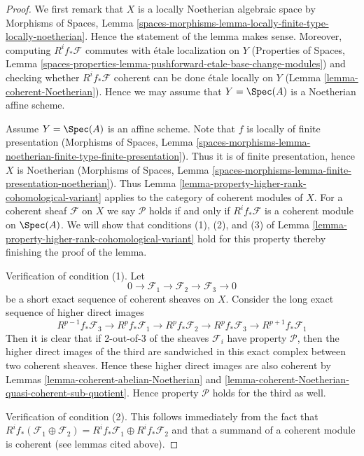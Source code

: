 \begin{proof}
We first remark that $X$ is a locally Noetherian algebraic space
by Morphisms of Spaces, Lemma
\ref{spaces-morphisms-lemma-locally-finite-type-locally-noetherian}.
Hence the statement of the lemma makes sense. Moreover, computing
$R^if_*\mathcal{F}$ commutes with \'etale localization on $Y$
(Properties of Spaces, Lemma
\ref{spaces-properties-lemma-pushforward-etale-base-change-modules})
and checking whether $R^if_*\mathcal{F}$ coherent can be done
\'etale locally on $Y$ (Lemma \ref{lemma-coherent-Noetherian}).
Hence we may assume that $Y = \Spec(A)$ is a Noetherian affine scheme.

\medskip\noindent
Assume $Y = \Spec(A)$ is an affine scheme. Note that $f$ is locally
of finite presentation
(Morphisms of Spaces, Lemma
\ref{spaces-morphisms-lemma-noetherian-finite-type-finite-presentation}).
Thus it is of finite presentation, hence $X$ is Noetherian
(Morphisms of Spaces, Lemma
\ref{spaces-morphisms-lemma-finite-presentation-noetherian}).
Thus Lemma \ref{lemma-property-higher-rank-cohomological-variant}
applies to the category of coherent modules of $X$.
For a coherent sheaf $\mathcal{F}$ on $X$ we say $\mathcal{P}$ holds
if and only if $R^if_*\mathcal{F}$ is a coherent module on $\Spec(A)$.
We will show that conditions (1), (2), and (3) of
Lemma \ref{lemma-property-higher-rank-cohomological-variant} hold
for this property thereby finishing the proof of the lemma.

\medskip\noindent
Verification of condition (1). Let
$$
0 \to \mathcal{F}_1 \to \mathcal{F}_2 \to \mathcal{F}_3 \to 0
$$
be a short exact sequence of coherent sheaves on $X$.
Consider the long exact sequence of higher direct images
$$
R^{p - 1}f_*\mathcal{F}_3 \to
R^pf_*\mathcal{F}_1 \to
R^pf_*\mathcal{F}_2 \to
R^pf_*\mathcal{F}_3 \to
R^{p + 1}f_*\mathcal{F}_1
$$
Then it is clear that if 2-out-of-3 of the sheaves $\mathcal{F}_i$
have property $\mathcal{P}$, then the higher direct images of the
third are sandwiched in this exact complex between two coherent
sheaves. Hence these higher direct images are also coherent by
Lemmas \ref{lemma-coherent-abelian-Noetherian} and
\ref{lemma-coherent-Noetherian-quasi-coherent-sub-quotient}.
Hence property $\mathcal{P}$ holds for the third as well.

\medskip\noindent
Verification of condition (2). This follows immediately from the fact
that $R^if_*(\mathcal{F}_1 \oplus \mathcal{F}_2) =
R^if_*\mathcal{F}_1 \oplus R^if_*\mathcal{F}_2$ and that a summand
of a coherent module is coherent (see lemmas cited above).


\end{proof}
